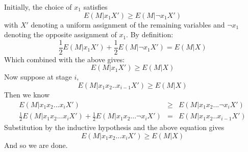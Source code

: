 \documentclass{article}
\begin{document}
Initially, the choice of $x_1$ satisfies
\[ E(M | x_1 X') \geq E(M | \neg x_1 X') \]
with $X'$ denoting a uniform assignment of the remaining variables and $\neg x_1$ denoting the opposite assignment of $x_1$.  By definition:
\[ \frac{1}{2} E(M | x_1 X') + \frac{1}{2} E(M | \neg x_1 X') = E(M | X) \]
Which combined with the above gives:
\[ E(M | x_1 X') \geq E(M | X) \]
Now suppose at stage $i$, 
\[ E(M | x_1 x_2 .. x_{i-1} X') \geq E(M | X) \]
Then we know
\begin{eqnarray*}
E(M | x_1 x_2 ... x_i X') & \geq & E(M | x_1 x_2 ... \neg x_i X') \\
\frac{1}{2}E(M | x_1 x_2 ... x_i X') + \frac{1}{2}E(M | x_1 x_2 ... \neg x_i X') & = & E(M | x_1 x_2 .. x_{i-1} X')
\end{eqnarray*}
Substitution by the inductive hypothesis and the above equation gives
\[ E(M | x_1 x_2 ... x_i X') \geq  E(M |X) \]
And so we are done.
\end{document}
